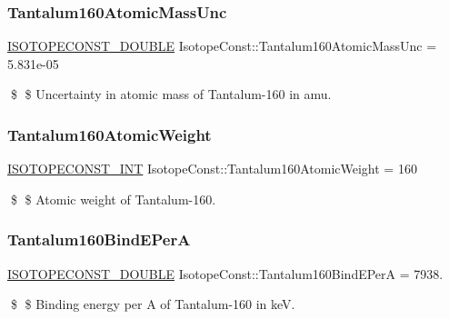 \subsubsection{\texorpdfstring{Tantalum160\+Atomic\+Mass\+Unc}{Tantalum160AtomicMassUnc}}
{\footnotesize\ttfamily \mbox{\hyperlink{group___isotope_const-_macros_ga8f45a7272ce02c0b4c65c44636ed719a}{I\+S\+O\+T\+O\+P\+E\+C\+O\+N\+S\+T\+\_\+\+D\+O\+U\+B\+LE}} Isotope\+Const\+::\+Tantalum160\+Atomic\+Mass\+Unc = 5.\+831e-\/05}

\$ \$ Uncertainty in atomic mass of Tantalum-\/160 in amu. \mbox{\label{group___isotope_const-_tantalum-_ta160_ga7d9fa377ff62fb619ed4c28f9bd38533}} 
\subsubsection{\texorpdfstring{Tantalum160\+Atomic\+Weight}{Tantalum160AtomicWeight}}
{\footnotesize\ttfamily \mbox{\hyperlink{group___isotope_const-_macros_ga5f18360b3e99483a35c32d789e62621c}{I\+S\+O\+T\+O\+P\+E\+C\+O\+N\+S\+T\+\_\+\+I\+NT}} Isotope\+Const\+::\+Tantalum160\+Atomic\+Weight = 160}

\$ \$ Atomic weight of Tantalum-\/160. \mbox{\label{group___isotope_const-_tantalum-_ta160_gabaecdcc0349f7a7334489b3a0b273d08}} 
\subsubsection{\texorpdfstring{Tantalum160\+Bind\+E\+PerA}{Tantalum160BindEPerA}}
{\footnotesize\ttfamily \mbox{\hyperlink{group___isotope_const-_macros_ga8f45a7272ce02c0b4c65c44636ed719a}{I\+S\+O\+T\+O\+P\+E\+C\+O\+N\+S\+T\+\_\+\+D\+O\+U\+B\+LE}} Isotope\+Const\+::\+Tantalum160\+Bind\+E\+PerA = 7938.}

\$ \$ Binding energy per A of Tantalum-\/160 in keV. \mbox{\label{group___isotope_const-_tantalum-_ta160_ga8f57d0c4702bf715be0608361db0e739}} 
